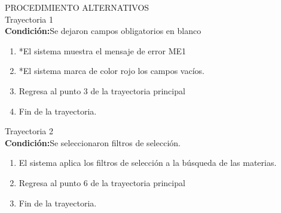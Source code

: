\vspace*{1cm}
\Large{PROCEDIMIENTO ALTERNATIVOS}\\
\large{Trayectoria 1}\\
\textbf{Condición:}Se dejaron campos obligatorios en blanco
\begin{enumerate}
    \item *El sistema muestra el mensaje de error ME1
    \item *El sistema marca de color rojo los campos vacíos.
    \item Regresa al punto 3 de la trayectoria principal
    \item Fin de la trayectoria.
\end{enumerate}
\large{Trayectoria 2}\\
\textbf{Condición:}Se seleccionaron filtros de selección.
\begin{enumerate}
    \item El sistema aplica los filtros de selección a la búsqueda de las materias.
    \item Regresa al punto 6 de la trayectoria principal
    \item Fin de la trayectoria.
\end{enumerate}